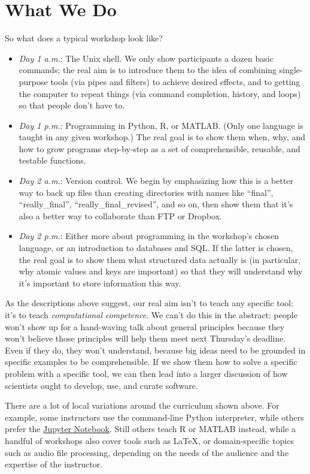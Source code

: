 \documentclass[10pt,a4paper,twocolumn]{article}
\begin{document}
\section{What We Do}\label{s:curriculum}

So what does a typical workshop look like?

\begin{itemize}
\item
  \emph{Day 1 a.m.}: The Unix shell. We only show participants a dozen
  basic commands; the real aim is to introduce them to the idea of
  combining single-purpose tools (via pipes and filters) to achieve
  desired effects, and to getting the computer to repeat things (via
  command completion, history, and loops) so that people don't have
  to.
\item
  \emph{Day 1 p.m.}: Programming in Python, R, or MATLAB. (Only one
  language is taught in any given workshop.) The real goal is to show
  them when, why, and how to grow programs step-by-step as a set of
  comprehensible, reusable, and testable functions.
\item
  \emph{Day 2 a.m.}: Version control. We begin by emphasizing how this
  is a better way to back up files than creating directories with names
  like ``final'', ``really\_final'', ``really\_final\_revised'', and
  so on, then show them that it's also a better way to collaborate
  than FTP or Dropbox.
\item
  \emph{Day 2 p.m.}: Either more about programming in the workshop's
  chosen language, or an introduction to databases and SQL.  If the
  latter is chosen, the real goal is to show them what structured data
  actually is (in particular, why atomic values and keys are
  important) so that they will understand why it's important to store
  information this way.
\end{itemize}

As the descriptions above suggest, our real aim isn't to teach any
specific tool: it's to teach \emph{computational competence}. We can't
do this in the abstract: people won't show up for a hand-waving talk
about general principles because they won't believe those principles
will help them meet next Thursday's deadline.  Even if they do, they
won't understand, because big ideas need to be grounded in specific
examples to be comprehensible. If we show them how to solve a specific
problem with a specific tool, we can then lead into a larger
discussion of how scientists ought to develop, use, and curate
software.

There are a lot of local variations around the curriculum shown above.
For example, some instructors use the command-line Python interpreter,
while others prefer the \href{https://jupyter.org/}{Jupyter Notebook}.
Still others teach R or MATLAB instead, while a handful of workshops
also cover tools such as LaTeX, or domain-specific topics such as
audio file processing, depending on the needs of the audience and the
expertise of the instructor.
\end{document}
